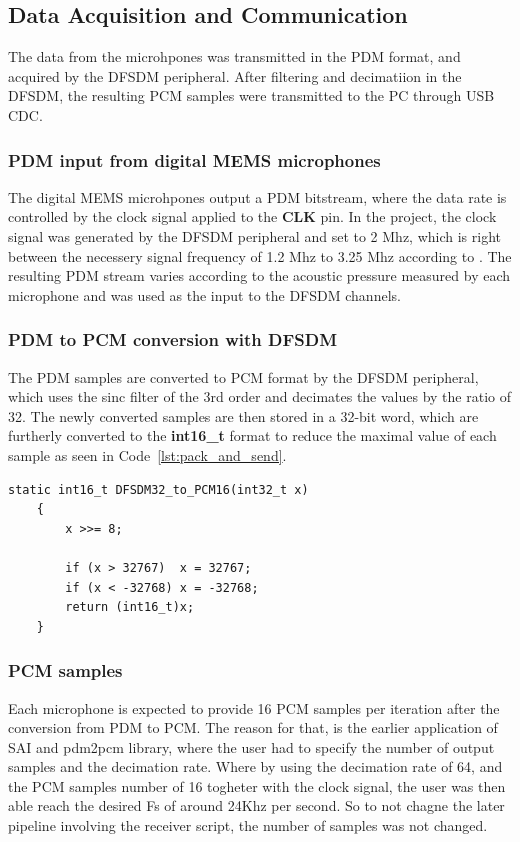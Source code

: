 \subsection{Data Acquisition and Communication}
The data from the microhpones was transmitted in the PDM format, and acquired by the DFSDM peripheral. After filtering and decimatiion in the DFSDM, the resulting PCM samples were transmitted to the PC through USB CDC. 

    \subsubsection{PDM input from digital MEMS microphones}
    The digital MEMS microhpones output a PDM bitstream, where the data rate is controlled by the clock signal applied to  the \textbf{CLK} pin. In the project, the clock signal was generated by the DFSDM peripheral and set to 2 Mhz, which is right between the necessery signal frequency of 1.2 Mhz to 3.25 Mhz according to \cite{st_mp34dt06j_2021}. The resulting PDM stream varies according to the acoustic pressure measured by each microphone and was used as the input to the DFSDM channels. 

    \subsubsection{PDM to PCM conversion with DFSDM}
    The PDM samples are converted to PCM format by the DFSDM peripheral, which uses the sinc filter of the 3rd order and decimates the values by the ratio of 32. The newly converted samples are then stored in a 32-bit word, which are furtherly converted to the \textbf{int16\_t} format to reduce the maximal value of each sample as seen in Code~\ref{lst:pack_and_send}.   
    
    \begin{lstlisting}[style=cstyle, caption={Limiting the shifted DFSDM output to the valid signed 16-bit PCM range. Generated by \cite{chatgpt2026}.}, label={lst:pack_and_send}]
    static int16_t DFSDM32_to_PCM16(int32_t x)
    {
        x >>= 8;
    
        if (x > 32767)  x = 32767;
        if (x < -32768) x = -32768;
        return (int16_t)x;
    }
    \end{lstlisting}
    \subsubsection{PCM samples}
    Each microphone is expected to provide 16 PCM samples per iteration after the conversion from PDM to PCM. The reason for that, is the earlier application of SAI and pdm2pcm library, where the user had to specify the number of output samples and the decimation rate. Where by using the decimation rate of 64, and the PCM samples number of 16 togheter with the clock signal, the user was then able reach the desired Fs of around 24Khz per second. So to not chagne the later pipeline involving the receiver script, the number of samples was not changed.  

